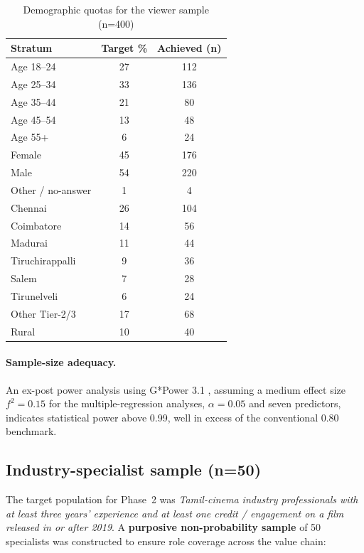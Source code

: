 \begin{table}[h]
\centering
\caption{Demographic quotas for the viewer sample (n=400)}
\label{tab:quotas}
\small
\begin{tabular}{lcc}
\toprule
\textbf{Stratum} & \textbf{Target \%} & \textbf{Achieved (n)}\\
\midrule
Age 18--24      & 27 & 112 \\
Age 25--34      & 33 & 136 \\
Age 35--44      & 21 & \phantom{0}80 \\
Age 45--54      & 13 & \phantom{0}48 \\
Age 55+         & \phantom{0}6 & \phantom{0}24 \\
\midrule
Female          & 45 & 176 \\
Male            & 54 & 220 \\
Other / no-answer  & \phantom{0}1 & \phantom{00}4 \\
\midrule
Chennai         & 26 & 104 \\
Coimbatore      & 14 & \phantom{0}56 \\
Madurai         & 11 & \phantom{0}44 \\
Tiruchirappalli & \phantom{0}9 & \phantom{0}36 \\
Salem           & \phantom{0}7 & \phantom{0}28 \\
Tirunelveli     & \phantom{0}6 & \phantom{0}24 \\
Other Tier-2/3  & 17 & \phantom{0}68 \\
Rural           & 10 & \phantom{0}40 \\
\bottomrule
\end{tabular}
\end{table}

\paragraph{Sample-size adequacy.}  An ex-post power analysis using
G*Power 3.1 \citep{faul2009}, assuming a medium effect size
$f^{2}=0.15$ for the multiple-regression analyses, $\alpha=0.05$ and
seven predictors, indicates statistical power above 0.99, well in
excess of the conventional 0.80 benchmark.

\subsection{Industry-specialist sample (n=50)}

The target population for Phase~2 was \emph{Tamil-cinema industry
professionals with at least three years' experience and at least one
credit / engagement on a film released in or after 2019}.  A
\textbf{purposive non-probability sample} of 50 specialists was
constructed to ensure role coverage across the value chain:

